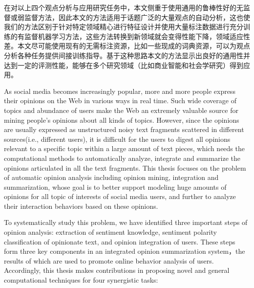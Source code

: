 \begin{cabstract}
在对以上四个观点分析与应用研究任务中，本文侧重于使用通用的鲁棒性好的无监督或弱监督方法，因此本文的方法适用于话题广泛的大量观点的自动分析，这也使我们的方法区别于针对特定领域精心进行特征设计并使用大量标注数据进行充分训练的有监督机器学习方法，这些方法转换到新领域就会变得性能下降，领域适应性差。本文尽可能使用现有的无需标注资源，比如一些现成的词典资源，可以为观点分析各种任务提供间接训练指导。基于这种思路本文的方法显示出良好的通用性并达到一定的评测性能，能够在多个研究领域（比如商业智能和社会学研究）得到应用。


\end{cabstract}

\begin{eabstract}

As social media becomes increasingly popular, more and more people express their opinions on the Web in various ways in real time. Such wide coverage of topics and abundance of users make the Web an extremely valuable source for mining people's opinions about all kinds of topics. However, since the opinions are usually expressed as unstructured noisy text fragments scattered in different sources(i.e., different users), it is difficult for the users to digest all opinions relevant to a specific topic within a large amount of text pieces, which needs the computational methods to automatically analyze, integrate and summarize the opinions articulated in all the text fragments. This thesis focuses on the problem of automatic opinion analysis including opinion mining, integration and summarization, whose goal is to better support modeling huge amounts of opinions for all topic of interests of social media users, and further to analyze their interaction behaviors based on these opinions. 

To systematically study this problem, we have identified three important steps of opinion analysis: extraction of sentiment knowledge, sentiment polarity classification of opinionate text, and opinion integration of users. These steps form three key components in an integrated opinion summarization system，the results of which are used to promote online behavior analysis of users. Accordingly, this thesis makes contributions in proposing novel and general computational techniques for four synergistic tasks: 


\end{eabstract}
